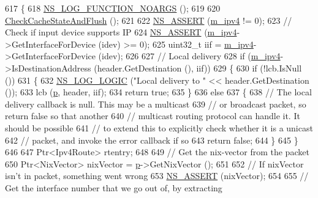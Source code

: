 \begin{DoxyCode}
617 \{
618   \hyperlink{log-macros-disabled_8h_a8f7e4afc291c9d29a65c18ac1f79197b}{NS\_LOG\_FUNCTION\_NOARGS} ();
619 
620   \hyperlink{classns3_1_1Ipv4NixVectorRouting_aeeafd72dfb17da8349627232c9e9984f}{CheckCacheStateAndFlush} ();
621 
622   \hyperlink{assert_8h_a6dccdb0de9b252f60088ce281c49d052}{NS\_ASSERT} (\hyperlink{classns3_1_1Ipv4NixVectorRouting_a215cb71f30d85df9ec7176ca22620519}{m\_ipv4} != 0);
623   \textcolor{comment}{// Check if input device supports IP}
624   \hyperlink{assert_8h_a6dccdb0de9b252f60088ce281c49d052}{NS\_ASSERT} (\hyperlink{classns3_1_1Ipv4NixVectorRouting_a215cb71f30d85df9ec7176ca22620519}{m\_ipv4}->GetInterfaceForDevice (idev) >= 0);
625   uint32\_t iif = \hyperlink{classns3_1_1Ipv4NixVectorRouting_a215cb71f30d85df9ec7176ca22620519}{m\_ipv4}->GetInterfaceForDevice (idev);
626 
627   \textcolor{comment}{// Local delivery}
628   \textcolor{keywordflow}{if} (\hyperlink{classns3_1_1Ipv4NixVectorRouting_a215cb71f30d85df9ec7176ca22620519}{m\_ipv4}->IsDestinationAddress (header.GetDestination (), iif))
629     \{
630       \textcolor{keywordflow}{if} (!lcb.IsNull ())
631         \{
632           \hyperlink{group__logging_ga88acd260151caf2db9c0fc84997f45ce}{NS\_LOG\_LOGIC} (\textcolor{stringliteral}{"Local delivery to "} << header.GetDestination ());
633           lcb (\hyperlink{lte__link__budget_8m_ac9de518908a968428863f829398a4e62}{p}, header, iif);
634           \textcolor{keywordflow}{return} \textcolor{keyword}{true};
635         \}
636       \textcolor{keywordflow}{else}
637         \{
638           \textcolor{comment}{// The local delivery callback is null.  This may be a multicast}
639           \textcolor{comment}{// or broadcast packet, so return false so that another}
640           \textcolor{comment}{// multicast routing protocol can handle it.  It should be possible}
641           \textcolor{comment}{// to extend this to explicitly check whether it is a unicast}
642           \textcolor{comment}{// packet, and invoke the error callback if so}
643           \textcolor{keywordflow}{return} \textcolor{keyword}{false};
644         \}
645     \}
646 
647   Ptr<Ipv4Route> rtentry;
648 
649   \textcolor{comment}{// Get the nix-vector from the packet}
650   Ptr<NixVector> nixVector = \hyperlink{lte__link__budget_8m_ac9de518908a968428863f829398a4e62}{p}->GetNixVector ();
651 
652   \textcolor{comment}{// If nixVector isn't in packet, something went wrong}
653   \hyperlink{assert_8h_a6dccdb0de9b252f60088ce281c49d052}{NS\_ASSERT} (nixVector);
654 
655   \textcolor{comment}{// Get the interface number that we go out of, by extracting}

\end{DoxyCode}
